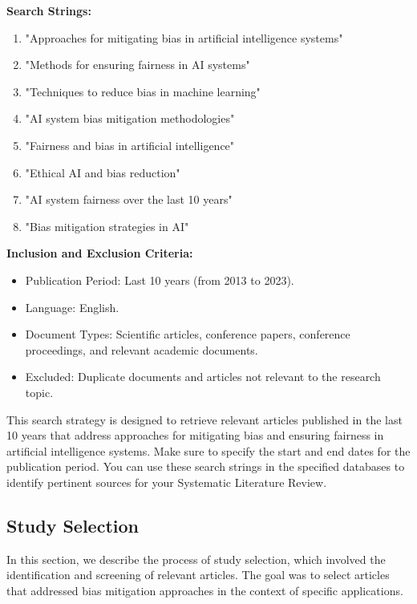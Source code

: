 \documentclass{article}
\begin{document}
\textbf{Search Strings:}
\begin{enumerate}
    \item "Approaches for mitigating bias in artificial intelligence systems"
    \item "Methods for ensuring fairness in AI systems"
    \item "Techniques to reduce bias in machine learning"
    \item "AI system bias mitigation methodologies"
    \item "Fairness and bias in artificial intelligence"
    \item "Ethical AI and bias reduction"
    \item "AI system fairness over the last 10 years"
    \item "Bias mitigation strategies in AI"
\end{enumerate}

\textbf{Inclusion and Exclusion Criteria:}
\begin{itemize}
    \item Publication Period: Last 10 years (from 2013 to 2023).
    \item Language: English.
    \item Document Types: Scientific articles, conference papers, conference proceedings, and relevant academic documents.
    \item Excluded: Duplicate documents and articles not relevant to the research topic.
\end{itemize}

This search strategy is designed to retrieve relevant articles published in the last 10 years that address approaches for mitigating bias and ensuring fairness in artificial intelligence systems. Make sure to specify the start and end dates for the publication period. You can use these search strings in the specified databases to identify pertinent sources for your Systematic Literature Review.

    \subsection{Study Selection}
    In this section, we describe the process of study selection, which involved the identification and screening of relevant articles. The goal was to select articles that addressed bias mitigation approaches in the context of specific applications.
\end{document}
